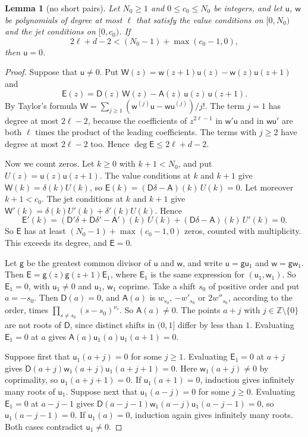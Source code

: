 \documentclass[11pt]{amsart}
\newtheorem{lemma}[theorem]{Lemma}
\theoremstyle{definition}
\theoremstyle{remark}
\numberwithin{equation}{section}
\newcommand{\Z}{\mathbb Z}
\begin{document}
\begin{lemma}[no short pairs]\label{lem:noshort}
Let $N_0\ge1$ and $0\le c_0\le N_0$ be integers, and let $\mathsf u$, $\mathsf w$ be polynomials of degree at most
$\ell$ that satisfy the value conditions on $[0,N_0)$ and the jet conditions on $[0,c_0)$. If
\[
 2\ell+d-2<(N_0-1)+\max(c_0-1,0),
\]
then $\mathsf u=0$.
\end{lemma}
\begin{proof}
Suppose that $\mathsf u\ne0$. Put $\mathsf W(z)=\mathsf w(z+1)\mathsf u(z)-\mathsf w(z)\mathsf u(z+1)$ and
\[
 \mathsf E(z)=\mathsf D(z)\,\mathsf W(z)-\mathsf A(z)\,\mathsf u(z)\,\mathsf u(z+1).
\]
By Taylor's formula $\mathsf W=\sum_{j\ge1}(\mathsf w^{(j)}\mathsf u-\mathsf w\mathsf u^{(j)})/j!$. The term $j=1$ has
degree at most $2\ell-2$, because the coefficients of $z^{2\ell-1}$ in $\mathsf w'\mathsf u$ and in $\mathsf w\mathsf u'$
are both $\ell$ times the product of the leading coefficients. The terms with $j\ge2$ have degree at most $2\ell-2$ too.
Hence $\deg\mathsf E\le2\ell+d-2$.

Now we count zeros. Let $k\ge0$ with $k+1<N_0$, and put $U(z)=\mathsf u(z)\mathsf u(z+1)$. The value conditions at $k$
and $k+1$ give $\mathsf W(k)=\delta(k)U(k)$, so $\mathsf E(k)=(\mathsf D\delta-\mathsf A)(k)\,U(k)=0$. Let moreover
$k+1<c_0$. The jet conditions at $k$ and $k+1$ give $\mathsf W'(k)=\delta(k)U'(k)+\delta'(k)U(k)$. Hence
\[
 \mathsf E'(k)=(\mathsf D'\delta+\mathsf D\delta'-\mathsf A')(k)\,U(k)+(\mathsf D\delta-\mathsf A)(k)\,U'(k)=0 .
\]
So $\mathsf E$ has at least $(N_0-1)+\max(c_0-1,0)$ zeros, counted with multiplicity. This exceeds its degree, and
$\mathsf E=0$.

Let $\mathsf g$ be the greatest common divisor of $\mathsf u$ and $\mathsf w$, and write $\mathsf u=\mathsf g\mathsf u_1$
and $\mathsf w=\mathsf g\mathsf w_1$. Then $\mathsf E=\mathsf g(z)\mathsf g(z+1)\mathsf E_1$, where $\mathsf E_1$ is the
same expression for $(\mathsf u_1,\mathsf w_1)$. So $\mathsf E_1=0$, with $\mathsf u_1\ne0$ and $\mathsf u_1$,
$\mathsf w_1$ coprime. Take a shift $s_0$ of positive order and put $a=-s_0$. Then $\mathsf D(a)=0$, and $\mathsf A(a)$
is $w_{s_0}$, $-w'_{s_0}$ or $2w''_{s_0}$, according to the order, times $\prod_{s\ne s_0}(s-s_0)^{\nu_s}$. So $\mathsf A(a)\ne0$.
The points $a+j$ with $j\in\Z\setminus\{0\}$ are not roots of $\mathsf D$, since distinct shifts in $(0,1]$ differ by
less than $1$. Evaluating $\mathsf E_1=0$ at $a$ gives $\mathsf A(a)\mathsf u_1(a)\mathsf u_1(a+1)=0$.

Suppose first that $\mathsf u_1(a+j)=0$ for some $j\ge1$. Evaluating $\mathsf E_1=0$ at $a+j$ gives
$\mathsf D(a+j)\mathsf w_1(a+j)\mathsf u_1(a+j+1)=0$. Here $\mathsf w_1(a+j)\ne0$ by coprimality, so
$\mathsf u_1(a+j+1)=0$. If $\mathsf u_1(a+1)=0$, induction gives infinitely many roots of $\mathsf u_1$. Suppose next
that $\mathsf u_1(a-j)=0$ for some $j\ge0$. Evaluating $\mathsf E_1=0$ at $a-j-1$ gives
$\mathsf D(a-j-1)\mathsf w_1(a-j)\mathsf u_1(a-j-1)=0$, so $\mathsf u_1(a-j-1)=0$. If $\mathsf u_1(a)=0$, induction
again gives infinitely many roots. Both cases contradict $\mathsf u_1\ne0$.
\end{proof}
\end{document}
